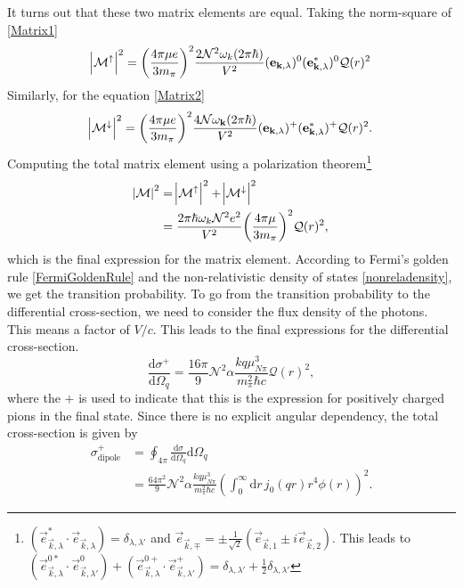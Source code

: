 It turns out that these two matrix elements are equal. Taking the norm-square of \eqref{Matrix1}
\begin{equation}
	\abs{\mathcal{M}^\uparrow}^2 = \bigg( \frac{4\pi \mu e}{3m_\pi}\bigg)^2 \frac{2 \mathcal{N}^2\omega_k (2\pi \hbar)}{V^2}(\bm{\mathrm{e}}_{\bm{\mathrm{k}},\lambda})^0(\bm{\mathrm{e}}_{\bm{\mathrm{k}},\lambda}^*)^0 \mathcal{Q}(r)^2 
\end{equation}
Similarly, for the equation \eqref{Matrix2}
\begin{equation}
	\abs{\mathcal{M}^\downarrow}^2 = \bigg( \frac{4\pi \mu e}{3 m_\pi}\bigg)^2 \frac{4\mathcal{N}\omega_{\bm{\mathrm{k}}}(2\pi\hbar)}{V^2}(\bm{\mathrm{e}}_{\bm{\mathrm{k}},\lambda})^+(\bm{\mathrm{e}}_{\bm{\mathrm{k}},\lambda}^*)^+ \mathcal{Q}(r)^2.
\end{equation}
Computing the total matrix element using a polarization theorem\footnote{$(\vec{e}_{\vec{k},\lambda}^*\cdot \vec{e}_{\vec{k},\lambda})=\delta_{\lambda,\lambda'}$ and $\vec{e}_{\vec{k},\mp}=\pm\frac{1}{\sqrt{2}}(\vec{e}_{\vec{k},1}\pm i\vec{e}_{\vec{k},2})$. This leads to $(\vec{e}^{0*}_{\vec{k},\lambda}\cdot\vec{e}^{0}_{\vec{k},\lambda'})+(\vec{e}^{0+}_{\vec{k},\lambda}\cdot\vec{e}^{+}_{\vec{k},\lambda'})=\delta_{\lambda,\lambda'}+\frac{1}{2}\delta_{\lambda,\lambda'}$}
\begin{align}
	\abs{\mathcal{M}}^2 &= \abs{\mathcal{M}^\uparrow}^2 + \abs{\mathcal{M}^\downarrow}^2 \\
	&= \frac{2\pi \hbar \omega_k \mathcal{N}^2 e^2}{V^2} \bigg( \frac{4\pi\mu}{3m_\pi}\bigg)^2 \mathcal{Q}(r)^2,
\end{align}
which is the final expression for the matrix element. According to Fermi's golden rule \eqref{FermiGoldenRule} and the non-relativistic density of states \eqref{nonreladensity}, we get the transition probability.
To go from the transition probability to the differential cross-section, we need to consider the flux density of the photons. This means a factor of $V/c$. This leads to the final expressions for the differential cross-section.
\begin{equation}\label{diffcrosssection}
	\frac{\text{d}\sigma^+}{\text{d}\Omega_q}=\frac{16 \pi}{9} \mathcal{N}^2 \alpha\frac{kq\mu^3_{N\pi}}{m_\pi^2 \hbar c}\mathcal{Q}(r)^2,
\end{equation}
where the $+$ is used to indicate that this is the expression for positively charged pions in the final state. Since there is no explicit angular dependency, the total cross-section is given by
\begin{align} 
	\sigma_\text{dipole}^+ & = \oint_{4\pi} \frac{\text{d}\sigma}{\text{d}\Omega_q} \text{d}\Omega_q \\
	&= \frac{64\pi^2}{9}\mathcal{N}^2 \alpha \frac{kq\mu^3_{N\pi}}{m_\pi^2 \hbar c} \left( \int_0^\infty \text{d}r \, j_0(qr)r^4 \phi(r)\right)^2 \label{dipoletotalcross}.
\end{align}
